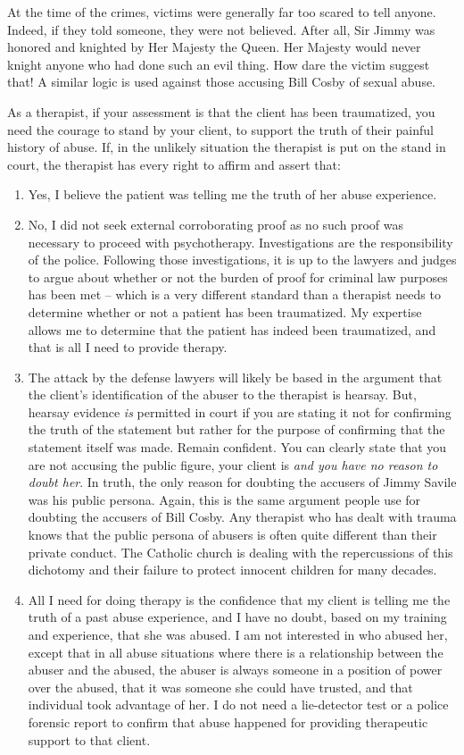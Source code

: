 \documentclass[]{book}
\begin{document}
At the time of the crimes, victims were generally far too scared to tell anyone. Indeed, if they told someone, they were not believed. After all, Sir Jimmy was honored and knighted by Her Majesty the Queen. Her Majesty would never knight anyone who had done such an evil thing. How dare the victim suggest that! A similar logic is used against those accusing Bill Cosby of sexual abuse.

As a therapist, if your assessment is that the client has been traumatized, you need the courage to stand by your client, to support the truth of their painful history of abuse. If, in the unlikely situation the therapist is put on the stand in court, the therapist has every right to affirm and assert that:

\begin{enumerate}
\def\labelenumi{\arabic{enumi}.}
\item
  Yes, I believe the patient was telling me the truth of her abuse experience.
\item
  No, I did not seek external corroborating proof as no such proof was necessary to proceed with psychotherapy. Investigations are the responsibility of the police. Following those investigations, it is up to the lawyers and judges to argue about whether or not the burden of proof for criminal law purposes has been met -- which is a very different standard than a therapist needs to determine whether or not a patient has been traumatized. My expertise allows me to determine that the patient has indeed been traumatized, and that is all I need to provide therapy.
\item
  The attack by the defense lawyers will likely be based in the argument that the client's identification of the abuser to the therapist is hearsay. But, hearsay evidence \emph{is} permitted in court if you are stating it not for confirming the truth of the statement but rather for the purpose of confirming that the statement itself was made. Remain confident. You can clearly state that you are not accusing the public figure, your client is \emph{and you have no reason to doubt her}. In truth, the only reason for doubting the accusers of Jimmy Savile was his public persona. Again, this is the same argument people use for doubting the accusers of Bill Cosby. Any therapist who has dealt with trauma knows that the public persona of abusers is often quite different than their private conduct. The Catholic church is dealing with the repercussions of this dichotomy and their failure to protect innocent children for many decades.
\item
  All I need for doing therapy is the confidence that my client is telling me the truth of a past abuse experience, and I have no doubt, based on my training and experience, that she was abused. I am not interested in who abused her, except that in all abuse situations where there is a relationship between the abuser and the abused, the abuser is always someone in a position of power over the abused, that it was someone she could have trusted, and that individual took advantage of her. I do not need a lie-detector test or a police forensic report to confirm that abuse happened for providing therapeutic support to that client.
\end{enumerate}
\end{document}
